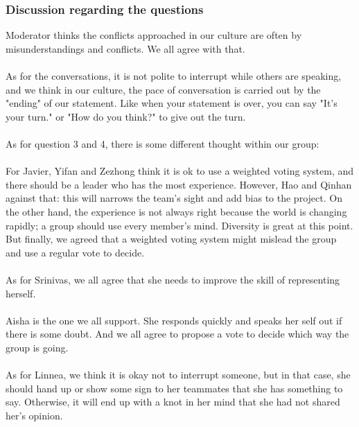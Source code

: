 		\subsubsection{Discussion regarding the questions}
		Moderator thinks the conflicts approached in our culture are often by misunderstandings and conflicts.  We all agree with that.\\\\
		As for the conversations, it is not polite to interrupt while others are speaking, and we think in our culture, the pace of conversation is carried out by the "ending" of our statement. Like when your statement is over, you can say "It's your turn." or "How do you think?" to give out the turn. \\\\
		As for question 3 and 4, there is some different thought within our group:\\\\
		For Javier, Yifan and Zezhong think it is ok to use a weighted voting system, and there should be a leader who has the most experience. However, Hao and Qinhan against that: this will narrows the team's sight and add bias to the project. On the other hand, the experience is not always right because the world is changing rapidly; a group should use every member's mind. Diversity is great at this point. But finally, we agreed that a weighted voting system might mislead the group and use a regular vote to decide.\\\\
		As for Srinivas, we all agree that she needs to improve the skill of representing herself.\\\\
		Aisha is the one we all support. She responds quickly and speaks her self out if there is some doubt. And we all agree to propose a vote to decide which way the group is going.\\\\
		As for Linnea, we think it is okay not to interrupt someone, but in that case, she should hand up or show some sign to her teammates that she has something to say. Otherwise, it will end up with a knot in her mind that she had not shared her's opinion.
		
		